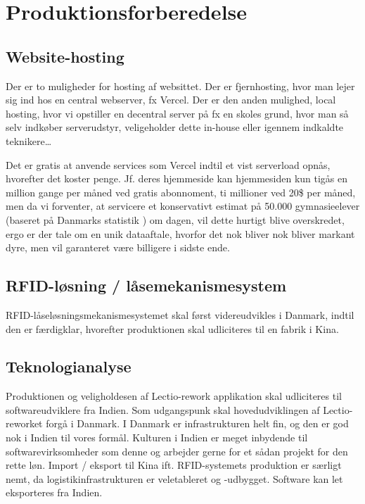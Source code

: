 \section{Produktionsforberedelse}
    \subsection{Website-hosting}
        Der er to muligheder for hosting af websittet.
        Der er fjernhosting, hvor man lejer sig ind hos en central webserver, fx Vercel.
        Der er den anden mulighed, local hosting, hvor vi opstiller en decentral server på fx en skoles grund, hvor man så selv indkøber serverudstyr, veligeholder dette in-house eller igennem indkaldte teknikere\dots

        Det er gratis at anvende services som Vercel indtil et vist serverload opnås, hvorefter det koster penge. Jf. deres hjemmeside\cite{vercelprincing} kan hjemmesiden kun tigås en million gange per måned ved gratis abonnoment, ti millioner ved 20\$ per måned, men da vi forventer, at servicere et konservativt estimat på 50.000 gymnasieelever (baseret på Danmarks statistik \cite{ungudd}) om dagen, vil dette hurtigt blive overskredet, ergo er der tale om en unik dataaftale, hvorfor det nok bliver nok bliver markant dyre, men vil garanteret være billigere i sidste ende.

    \subsection{RFID-løsning /  låsemekanismesystem}
        RFID-låseløsningsmekanismesystemet skal først videreudvikles i Danmark, indtil den er færdigklar, hvorefter produktionen skal udliciteres til en fabrik i Kina.
    \subsection{Teknologianalyse}
        Produktionen og veligholdesen af Lectio-rework applikation skal udliciteres til softwareudviklere fra Indien.
        Som udgangspunk skal hovedudviklingen af Lectio-reworket forgå i Danmark. I Danmark er infrastrukturen helt fin, og den er god nok i Indien til vores formål. Kulturen i Indien
        er meget inbydende til softwarevirksomheder som denne og arbejder gerne for et sådan projekt for den rette løn. Import / eksport til Kina ift. RFID-systemets 
        produktion er særligt nemt, da logistikinfrastrukturen er veletableret og -udbygget. Software kan let eksporteres fra Indien.
